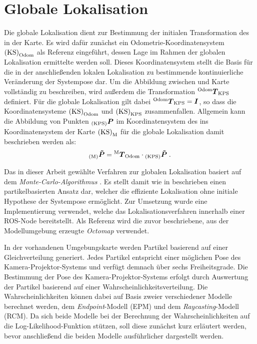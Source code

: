 \section{Globale Lokalisation}
\label{chap.globloc}
Die globale Lokalisation dient zur Bestimmung der initialen Transformation des  in der Karte. Es wird dafür zunächst ein Odometrie-Koordinatensystem ${\mathrm{(KS)}}_{\mathrm{Odom}}$ als Referenz eingeführt, dessen Lage im Rahmen der globalen Lokalisation ermittelte werden soll. Dieses Koordinatensystem stellt die Basis für die in der anschließenden lokalen Lokalisation zu bestimmende kontinuierliche Veränderung der Systempose dar. Um die Abbildung zwischen \kps{} und Karte vollständig zu beschreiben, wird außerdem die Transformation ${^{\mathrm{Odom}}\mbox{\boldmath{$T$}}_{\mathrm{KPS}}}$ definiert. Für die globale Lokalisation gilt dabei ${^{\mathrm{Odom}}\mbox{\boldmath{$T$}}_{\mathrm{KPS}}} = \mbox{\boldmath{$I$}}$, so dass die Koordinatensysteme ${\mathrm{(KS)}}_{\mathrm{Odom}}$ und ${\mathrm{(KS)}}_{\mathrm{KPS}}$ zusammenfallen. Allgemein kann die Abbildung von Punkten ${_{{\mathrm{(KPS)}}}}\mbox{\boldmath{$P$}}$ im Koordinatensystem des  ins Koordinatensystem der Karte ${\mathrm{(KS)}}_{\mathrm{M}}$ für die globale Lokalisation damit beschrieben werden als:
%
\begin{equation}
{_{{\mathrm{(M)}}}}\mbox{\boldmath{$\tilde{P}$}} = {^{\mathrm{M}}\mbox{\boldmath{$T$}}_{\mathrm{Odom}}} \cdot {_{{\mathrm{(KPS)}}}}\mbox{\boldmath{$\tilde{P}$}} \; \text{.}
\label{eq.globloc}
\end{equation}

\prever{
}

Das in dieser Arbeit gewählte Verfahren zur globalen Lokalisation basiert auf dem \textit{Monte-Carlo-Algorithmus} \cite{Dellaert1999}. Es stellt damit wie in  beschrieben einen partikelbasierten Ansatz dar, welcher die effiziente Lokalisation ohne initiale Hypothese der Systempose ermöglicht. Zur Umsetzung wurde eine Implementierung \cite{humanoidNavigation} verwendet, welche das Lokalisationsverfahren innerhalb einer ROS-Node bereitstellt. Als Referenz wird die zuvor beschriebene, aus der Modellumgebung erzeugte \textit{Octomap} verwendet.\\

\prever{
}

In der vorhandenen Umgebungskarte werden Partikel basierend auf einer Gleichverteilung generiert. Jedes Partikel entspricht einer möglichen Pose des Kamera-Projektor-Systems und verfügt demnach über sechs Freiheitsgrade. Die Bestimmung der Pose des Kamera-Projektor-Systems erfolgt durch Auswertung der Partikel basierend auf einer Wahrscheinlichkeitsverteilung. Die Wahrscheinlichkeiten können dabei auf Basis zweier verschiedener Modelle berechnet werden, dem \textit{Endpoint}-Modell (EPM) und dem \textit{Raycasting}-Modell (RCM). Da sich beide Modelle bei der Berechnung der Wahrscheinlichkeiten auf die Log-Likelihood-Funktion stützen, soll diese zunächst kurz erläutert werden, bevor anschließend die beiden Modelle ausführlicher dargestellt werden.

